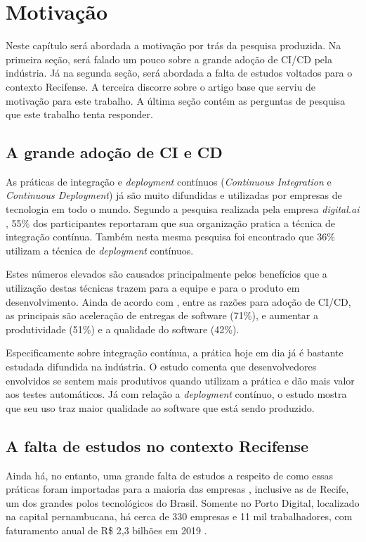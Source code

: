 
\section{Motivação}
Neste capítulo será abordada a motivação por trás da pesquisa produzida. Na primeira seção, será falado um pouco sobre a grande adoção de CI/CD pela indústria. Já na segunda seção, será abordada a falta de estudos voltados para o contexto Recifense. A terceira discorre sobre o artigo base que serviu de motivação para este trabalho. A última seção contém as perguntas de pesquisa que este trabalho tenta responder.

\subsection{A grande adoção de CI e CD}
As práticas de integração e \emph{deployment} contínuos (\emph{Continuous Integration} e \emph{Continuous Deployment}) já são muito difundidas e utilizadas por empresas de tecnologia em todo o mundo. Segundo a pesquisa realizada pela empresa \emph{digital.ai} \cite{stateAgileReport2020}, 55\% dos participantes reportaram que sua organização pratica a técnica de integração contínua. Também nesta mesma pesquisa foi encontrado que 36\% utilizam a técnica de \emph{deployment} contínuos. 

Estes números elevados são causados principalmente pelos benefícios que a utilização destas técnicas trazem para a equipe e para o produto em desenvolvimento. Ainda de acordo com \cite{stateAgileReport2020}, entre as razões para adoção de CI/CD, as principais são aceleração de entregas de software (71\%), e aumentar a produtividade (51\%) e a qualidade do software (42\%). 

Especificamente sobre integração contínua, a prática hoje em dia já é bastante estudada difundida na indústria. O estudo \cite{hilton2016} comenta que desenvolvedores envolvidos se sentem mais produtivos quando utilizam a prática e dão mais valor aos testes automáticos.  Já com relação a \emph{deployment} contínuo, o estudo \cite{savor2015} mostra que seu uso traz maior qualidade ao software que está sendo produzido. 

\subsection{A falta de estudos no contexto Recifense}

Ainda há, no entanto, uma grande falta de estudos a respeito de como essas práticas foram importadas para a maioria das empresas \cite{empiricalStudy2016}, inclusive as de Recife, um dos grandes polos tecnológicos do Brasil. Somente no Porto Digital, localizado na capital pernambucana, há cerca de 330 empresas e 11 mil trabalhadores, com faturamento anual de R\$ 2,3 bilhões em 2019 \cite{portoDigital}.

